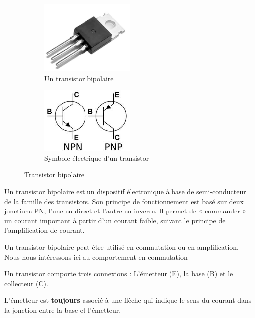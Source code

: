 \documentclass[10pt,fleqn]{article} %
\begin{document}
\begin{figure}[h]
  \centering
  \begin{subfigure}{0.5\textwidth}
    \centering
    \includegraphics[width=0.5\textwidth]{images/transistor_img}
    \caption{Un transistor bipolaire}
  \end{subfigure}\hfill
  \begin{subfigure}{.5\textwidth}
    \centering
    \includegraphics[width=0.5\textwidth]{images/npn_pnp}
    \caption{Symbole électrique d'un transistor}
  \end{subfigure}
  \caption{Transistor bipolaire}
  \label{fig:transistor}
\end{figure}

Un transistor bipolaire est un dispositif électronique à base de semi-conducteur de la famille des transistors.
Son principe de fonctionnement est basé sur deux jonctions PN, l'une en direct et l'autre en inverse.
Il permet de « commander » un courant important à partir d'un courant faible, suivant le principe de l'amplification de courant.

Un transistor bipolaire peut être utilisé en commutation ou en amplification. Nous nous intéressons ici au comportement en commutation

\begin{aretenir}
  Un transistor comporte trois connexions : L'émetteur (E), la base (B) et le collecteur (C).
\end{aretenir}

\begin{remark}
  L'émetteur est \textbf{toujours} associé à une flèche qui indique le sens du courant dans la jonction entre la base et l'émetteur.
\end{remark}
\end{document}
